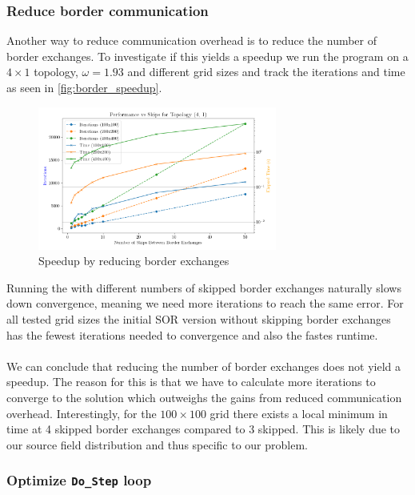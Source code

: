 \subsubsection{Reduce border communication}
Another way to reduce communication overhead is to reduce the number of border exchanges. To investigate if this yields a speedup  we run the program on a $4 \times 1$ topology, $\omega = 1.93$ and different grid sizes and track the iterations and time as seen in \autoref{fig:border_speedup}.

\begin{figure}[H]
    \centering
    \includegraphics[width=0.7\textwidth]{../fig/lab1/skips_topology_4x1.png}
    \caption{Speedup by reducing border exchanges}
    \label{fig:border_speedup}
\end{figure}

Running the with different numbers of skipped border exchanges naturally slows down convergence, meaning we need more iterations to reach the same error. For all tested grid sizes the initial SOR version without skipping border exchanges has the fewest iterations needed to convergence and also the fastes runtime. \\

\\
We can conclude that reducing the number of border exchanges does not yield a speedup. The reason for this is that we have to calculate more iterations to converge to the solution which outweighs the gains from reduced communication overhead. Interestingly, for the $100 \times 100$ grid there exists a local minimum in time at 4 skipped border exchanges compared to 3 skipped. This is likely due to our source field distribution and thus specific to our problem.

\subsubsection{Optimize \texttt{Do\_Step} loop}

